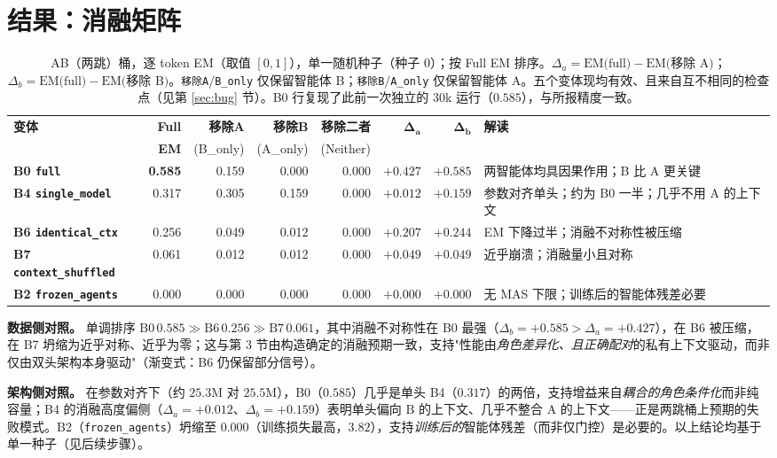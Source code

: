 \documentclass[10pt]{article}
\begin{document}
\section{结果：消融矩阵}
\begin{table}[H]
\centering
\footnotesize
\begin{tabular}{@{}l r r r r r r p{2.9cm}@{}}
\toprule
\textbf{变体} & \textbf{Full} & \textbf{移除A} & \textbf{移除B} & \textbf{移除二者} &
$\boldsymbol{\Delta_a}$ & $\boldsymbol{\Delta_b}$ & \textbf{解读} \\
 & \textbf{EM} & \footnotesize(B\_only) & \footnotesize(A\_only) & \footnotesize(Neither) & & & \\
\midrule
\textbf{B0 \texttt{full}}            & \textbf{0.585} & 0.159 & 0.000 & 0.000 & $+0.427$ & $+0.585$ & 两智能体均具因果作用；B 比 A 更关键 \\
\textbf{B4 \texttt{single\_model}}   & 0.317 & 0.305 & 0.159 & 0.000 & $+0.012$ & $+0.159$ & 参数对齐单头；约为 B0 一半；几乎不用 A 的上下文 \\
\textbf{B6 \texttt{identical\_ctx}}  & 0.256 & 0.049 & 0.012 & 0.000 & $+0.207$ & $+0.244$ & EM 下降过半；消融不对称性被压缩 \\
\textbf{B7 \texttt{context\_shuffled}} & 0.061 & 0.012 & 0.012 & 0.000 & $+0.049$ & $+0.049$ & 近乎崩溃；消融量小且对称 \\
\textbf{B2 \texttt{frozen\_agents}}  & 0.000 & 0.000 & 0.000 & 0.000 & $+0.000$ & $+0.000$ & 无 MAS 下限；训练后的智能体残差必要 \\
\bottomrule
\end{tabular}
\caption{AB（两跳）桶，逐 token EM（取值 $[0,1]$），单一随机种子（种子 0）；按 Full EM 排序。$\Delta_a = \text{EM(full)} - \text{EM(移除 A)}$；$\Delta_b = \text{EM(full)} - \text{EM(移除 B)}$。\texttt{移除A}/\texttt{B\_only} 仅保留智能体 B；\texttt{移除B}/\texttt{A\_only} 仅保留智能体 A。五个变体现均有效、且来自互不相同的检查点（见第 \ref{sec:bug} 节）。B0 行复现了此前一次独立的 30k 运行（$0.585$），与所报精度一致。}
\end{table}

\noindent{}\textbf{数据侧对照。} 单调排序 $\text{B0}\,0.585 \gg \text{B6}\,0.256 \gg \text{B7}\,0.061$，其中消融不对称性在 B0 最强（$\Delta_b{=}{+}0.585 > \Delta_a{=}{+}0.427$），在 B6 被压缩，在 B7 坍缩为近乎对称、近乎为零；这与第 3 节由构造确定的消融预期一致，支持"性能由\emph{角色差异化、且正确配对}的私有上下文驱动，而非仅由双头架构本身驱动"（渐变式：B6 仍保留部分信号）。

\noindent\textbf{架构侧对照。} 在参数对齐下（约 $25.3$M 对 $25.5$M），B0（$0.585$）几乎是单头 B4（$0.317$）的两倍，支持增益来自\emph{耦合的角色条件化}而非纯容量；B4 的消融高度偏侧（$\Delta_a{=}{+}0.012$、$\Delta_b{=}{+}0.159$）表明单头偏向 B 的上下文、几乎不整合 A 的上下文——正是两跳桶上预期的失败模式。B2（\texttt{frozen\_agents}）坍缩至 $0.000$（训练损失最高，$3.82$），支持\emph{训练后的}智能体残差（而非仅门控）是必要的。以上结论均基于单一种子（见后续步骤）。
\end{document}
